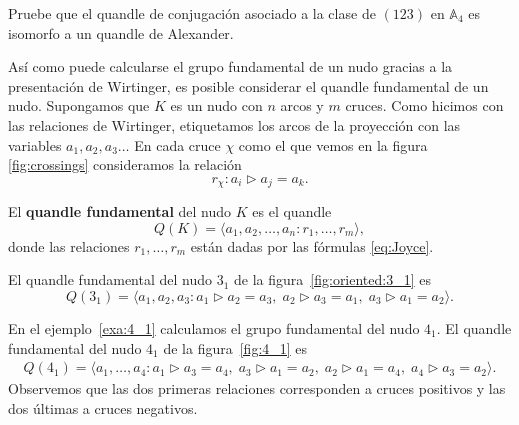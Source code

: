 \documentclass[graybox]{svmult}
\newcommand{\Alt}{\mathbb{A}}
\begin{document}
\begin{exercise}
	Pruebe que el quandle de conjugación asociado a la clase de $(123)$ en
	$\Alt_4$ es isomorfo a un quandle de Alexander.
\end{exercise}

\label{block:fundamental_quandle}
    Así como puede calcularse el grupo fundamental de un nudo gracias a la
    presentación de Wirtinger, es posible considerar el quandle fundamental de
    un nudo. Supongamos que $K$ es un nudo con $n$ arcos y $m$
    cruces.  Como hicimos con las relaciones de Wirtinger, etiquetamos los arcos de la
    proyección con las variables $a_1,a_2,a_3\dots$ En cada cruce $\chi$ como
    el que vemos en la figura \ref{fig:crossings} consideramos la relación
    \begin{equation}
        \label{eq:Joyce}
        r_\chi:a_i\triangleright a_j=a_k.          
    \end{equation}

\begin{definition}
    El \textbf{quandle fundamental} del nudo $K$ es el quandle 
    \[
        Q(K)=\langle a_1,a_2,\dots,a_n:r_1,\dots,r_m\rangle,
    \]
    donde las relaciones $r_1,\dots,r_m$ están dadas por las fórmulas
    \eqref{eq:Joyce}.
\end{definition}

\begin{example}
    \label{exa:3_1:fundamental_quandle}
    El quandle fundamental del nudo $3_1$ de la 
    figura~\ref{fig:oriented:3_1} es 
    \begin{equation}
        \label{eq:3_1:fundamental_quandle}
        Q(3_1)=\langle a_1,a_2,a_3:
		a_1\triangleright a_2=a_3,\; 
		a_2\triangleright a_3=a_1,\;
		a_3\triangleright a_1=a_2\rangle.
    \end{equation}
\end{example}
	
\begin{example}
    \label{exa:4_1:fundamental_quandle}
    En el ejemplo~\ref{exa:4_1} calculamos el grupo fundamental del nudo $4_1$.
    El quandle fundamental del nudo $4_1$ de la figura~\ref{fig:4_1} es 
    \begin{multline}
        \label{eq:4_1:fundamental_quandle}
        Q(4_1)=\langle a_1,\dots,a_4:
        a_1\triangleright a_3=a_4,\; 
		a_3\triangleright a_1=a_2,\;
        a_2\triangleright a_1=a_4,\;
        a_4\triangleright a_3=a_2\rangle.
    \end{multline}
    Observemos que las dos primeras relaciones corresponden a cruces positivos
    y las dos últimas a cruces negativos.  
\end{example}
\end{document}
